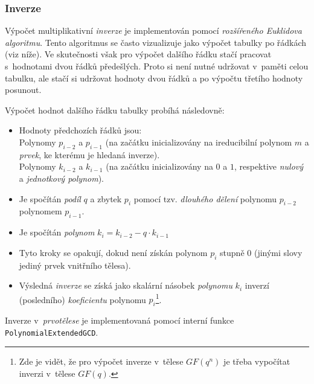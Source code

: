 \documentclass[thesis=M,czech,hidelinks]{FITthesis}[2012/06/26]
\newcommand{\0}{{\textcolor[gray]{0.80}{0}}}
\begin{document}
\subsubsection{Inverze}
Výpočet multiplikativní \emph{inverze} je implementován pomocí \emph{rozšířeného
Euklidova algoritmu}. Tento algoritmus se často vizualizuje jako výpočet tabulky
po řádkách (viz níže). Ve skutečnosti však pro výpočet dalšího řádku stačí
pracovat s~hodnotami dvou řádků předešlých. Proto si není nutné udržovat
v~paměti celou tabulku, ale stačí si udržovat hodnoty dvou řádků a po výpočtu
třetího hodnoty posunout.

Výpočet hodnot dalšího řádku tabulky probíhá následovně:
\begin{itemize}
    \item Hodnoty předchozích řádků jsou:\\
        \hspace*{0.6cm}Polynomy $p_{i-2}$ a $p_{i-1}$ (na začátku inicializovány
            na ireducibilní polynom $m$ a \emph{prvek}, ke kterému je hledaná
            inverze). \\
        \hspace*{0.6cm}Polynomy $k_{i-2}$ a $k_{i-1}$ (na začátku inicializovány
            na $0$ a $1$, respektive \emph{nulový} a \emph{jednotkový
            polynom}).

    \item Je spočítán \emph{podíl} $q$ a zbytek $p_i$ pomocí tzv. \emph{dlouhého
        dělení} polynomu $p_{i-2}$ polynomem $p_{i-1}$.

    \item Je spočítán \emph{polynom} $k_i = k_{i-2} - q \cdot k_{i-1} $

    \item Tyto kroky se opakují, dokud není získán polynom $p_i$ stupně $0$
        (jinými slovy jediný prvek vnitřního tělesa).

    \item Výsledná \emph{inverze} se získá jako skalární násobek \emph{polynomu}
        $k_i$ inverzí (posledního) \emph{koeficientu} polynomu $p_i$\footnote{
            Zde je vidět, že pro výpočet inverze v~tělese $GF(q^n)$ je třeba
            vypočítat inverzi v~tělese $GF(q)$.
        }.
\end{itemize}

Inverze v~\emph{prvotělese} je implementovaná pomocí interní funkce
\texttt{PolynomialExtendedGCD}.
\end{document}
